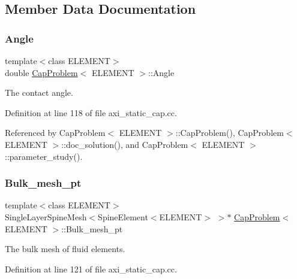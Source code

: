 \subsection{Member Data Documentation}
\mbox{\label{classCapProblem_a7a57e45e3f1b7d30ae9d99bff56e8f5d}} 
\subsubsection{\texorpdfstring{Angle}{Angle}}
{\footnotesize\ttfamily template$<$class E\+L\+E\+M\+E\+NT$>$ \\
double \hyperlink{classCapProblem}{Cap\+Problem}$<$ E\+L\+E\+M\+E\+NT $>$\+::Angle\hspace{0.3cm}{\ttfamily [private]}}



The contact angle. 



Definition at line 118 of file axi\+\_\+static\+\_\+cap.\+cc.



Referenced by Cap\+Problem$<$ E\+L\+E\+M\+E\+N\+T $>$\+::\+Cap\+Problem(), Cap\+Problem$<$ E\+L\+E\+M\+E\+N\+T $>$\+::doc\+\_\+solution(), and Cap\+Problem$<$ E\+L\+E\+M\+E\+N\+T $>$\+::parameter\+\_\+study().

\mbox{\label{classCapProblem_a6d74594a707d89fc3fd5b87bf1c26a5b}} 
\subsubsection{\texorpdfstring{Bulk\+\_\+mesh\+\_\+pt}{Bulk\_mesh\_pt}}
{\footnotesize\ttfamily template$<$class E\+L\+E\+M\+E\+NT$>$ \\
Single\+Layer\+Spine\+Mesh$<$Spine\+Element$<$E\+L\+E\+M\+E\+NT$>$ $>$$\ast$ \hyperlink{classCapProblem}{Cap\+Problem}$<$ E\+L\+E\+M\+E\+NT $>$\+::Bulk\+\_\+mesh\+\_\+pt\hspace{0.3cm}{\ttfamily [private]}}



The bulk mesh of fluid elements. 



Definition at line 121 of file axi\+\_\+static\+\_\+cap.\+cc.



